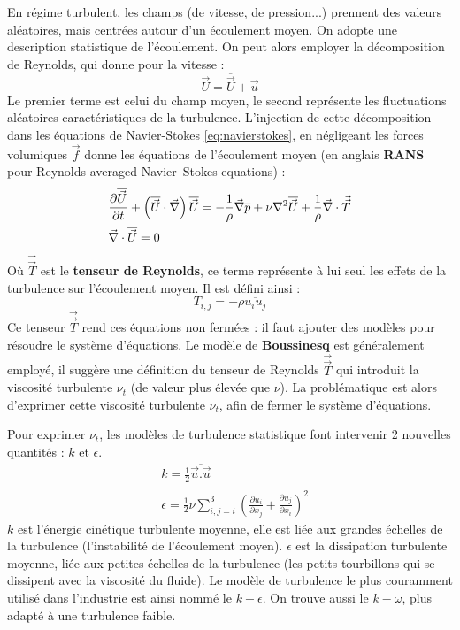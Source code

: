 En régime turbulent, les champs (de vitesse, de pression...) prennent des valeurs aléatoires, mais centrées autour d'un écoulement moyen. On adopte une description statistique de l'écoulement. On peut alors employer la décomposition de Reynolds, qui donne pour la vitesse :
%
\begin{equation}
\vec{U} = \overline{\vec{U}} + \vec{u}
\end{equation}
%
Le premier terme est celui du champ moyen, le second représente les fluctuations aléatoires caractéristiques de la turbulence. L'injection de cette décomposition dans les équations de Navier-Stokes \eqref{eq:navierstokes}, en négligeant les forces volumiques $\vec{f}$ donne les équations de l'écoulement moyen (en anglais \textbf{RANS} pour Reynolds-averaged Navier–Stokes equations) :
%
\begin{align}[left=\empheqlbrace]
 & \frac{ \partial\overline{\vec{U}} }{ \partial t }
 + \left( \overline{\vec{U}} \cdot \vec{\nabla} \right) \overline{\vec{U}}
 = - \frac{1}{\rho} \vec{\nabla} \overline{p}
 + \nu  \nabla^2 \overline{\vec{U}}
 + \frac{1}{\rho} \vec{\nabla} \cdot \vec{\vec{T}} \\
 \notag & \vec{\nabla} \cdot \overline{\vec{U}} = 0
\end{align}
%
Où $\vec{\vec{T}}$ est le \textbf{tenseur de Reynolds}, ce terme représente à lui seul les effets de la turbulence sur l'écoulement moyen. Il est défini ainsi :
%
\begin{equation}
T_{i,j} = - \rho \overline{u_i u_j}
\end{equation}
%
Ce tenseur $\vec{\vec{T}}$ rend ces équations non fermées : il faut ajouter des modèles pour résoudre le système d'équations. Le modèle de \textbf{Boussinesq} est généralement employé, il suggère une définition du tenseur de Reynolds $\vec{\vec{T}}$ qui introduit la viscosité turbulente $\nu_t$ (de valeur plus élevée que $\nu$). La problématique est alors d'exprimer cette viscosité turbulente $\nu_t$, afin de fermer le système d'équations.

Pour exprimer $\nu_t$, les modèles de turbulence statistique font intervenir 2 nouvelles quantités : $k$ et $\epsilon$.
%
\begin{align}
 & k = \frac{1}{2} \overline{\vec{u}.\vec{u}} \\
 & \epsilon = \frac{1}{2} \nu \sum\limits_{i,j=i}^3 \overline{\left(
 \frac{ \partial u_i }{ \partial x_j }
 + \frac{ \partial u_j }{ \partial x_i } \right)^2}
\end{align}
%
$k$ est l'énergie cinétique turbulente moyenne, elle est liée aux grandes échelles de la turbulence (l'instabilité de l'écoulement moyen). $\epsilon$ est la dissipation turbulente moyenne, liée aux petites échelles de la turbulence (les petits tourbillons qui se dissipent avec la viscosité du fluide). Le modèle de turbulence le plus couramment utilisé dans l'industrie est ainsi nommé le $k - \epsilon$. On trouve aussi le $k - \omega$, plus adapté à une turbulence faible.

